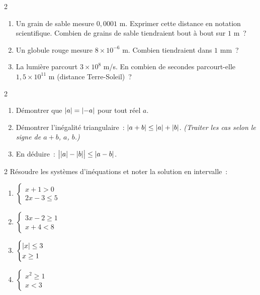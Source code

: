\begin{exo}{2}
\begin{enumerate}
  \item Un grain de sable mesure $0{,}0001$ m.
        Exprimer cette distance en notation scientifique.
        Combien de grains de sable tiendraient bout \`a bout sur $1$ m~?
  \item Un globule rouge mesure $8\times10^{-6}$ m.
        Combien tiendraient dans $1$ mm~?
  \item La lumi\`ere parcourt $3\times10^8$ m/s.
        En combien de secondes parcourt-elle $1{,}5\times10^{11}$ m
        (distance Terre-Soleil)~?
\end{enumerate}
\end{exo}

\begin{exo}{2}
\begin{enumerate}
  \item D\'emontrer que $\left|a\right| = \left|-a\right|$ pour tout r\'eel $a$.
  \item D\'emontrer l'in\'egalit\'e triangulaire~:
        $\left|a+b\right| \leq \left|a\right|+\left|b\right|$.
        \emph{(Traiter les cas selon le signe de $a+b$, $a$, $b$.)}
  \item En d\'eduire~: $\bigl|\left|a\right|-\left|b\right|\bigr| \leq \left|a-b\right|$.
\end{enumerate}
\end{exo}

\begin{exo}{2}
R\'esoudre les syst\`emes d'in\'equations et noter la solution en intervalle~:
\begin{enumerate}
  \item $\begin{cases} x + 1 > 0 \\ 2x - 3 \leq 5 \end{cases}$
  \item $\begin{cases} 3x - 2 \geq 1 \\ x + 4 < 8 \end{cases}$
  \item $\begin{cases} \left|x\right| \leq 3 \\ x \geq 1 \end{cases}$
  \item $\begin{cases} x^2 \geq 1 \\ x < 3 \end{cases}$
\end{enumerate}
\end{exo}

